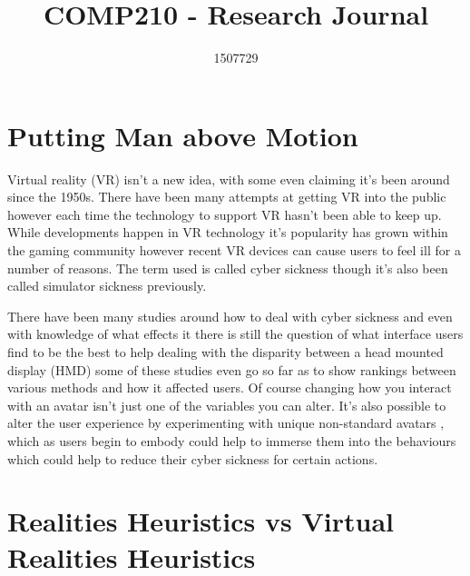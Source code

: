 \documentclass{scrartcl}
\title{COMP210 - Research Journal}
\author{1507729}
\begin{document}
\maketitle

\section{Putting Man above Motion}

Virtual reality (VR) isn't a new idea, with some even claiming it's been around since the 1950s. \cite{vrs2017origin} There have been many attempts at getting VR into the public however each time the technology to support VR hasn't been able to keep up. While developments happen in VR technology it's popularity has grown within the gaming community however recent VR devices can cause users to feel ill for a number of reasons. \cite{porcino2017minimizing} The term used is called cyber sickness though it's also been called simulator sickness \cite{gower1989simulator} previously.

There have been many studies around how to deal with cyber sickness and even with knowledge of what effects it there is still the question of what interface users find to be the best to help dealing with the disparity between a head mounted display (HMD) some of these studies even go so far as to show rankings between various methods and how it affected users. \cite{benzeroual2013cyber, mentzelopoulos2015hardware} Of course changing how you interact with an avatar isn't just one of the variables you can alter. It's also possible to alter the user experience by experimenting with unique non-standard avatars \cite{won2015homuncular}, which as users begin to embody could help to immerse them into the behaviours which could help to reduce their cyber sickness for certain actions. 

\section{Realities Heuristics vs Virtual Realities Heuristics}
\end{document}
